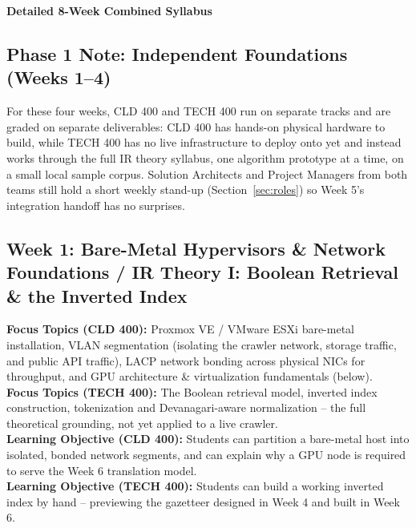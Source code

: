 \documentclass[10pt, a4paper]{article}
\newcommand{\sectionbar}[1]{%
  \par\vspace{0.7em}
  \refstepcounter{section}%
  \noindent\colorbox{secondary}{\parbox{\dimexpr\textwidth-2\fboxsep\relax}{\centering\color{white}\bfseries\Large #1}}%
  \par\vspace{0.5em}
}
\begin{document}
\newpage

\sectionbar{Detailed 8-Week Combined Syllabus}
\label{sec:weekly}

\subsection*{Phase 1 Note: Independent Foundations (Weeks 1--4)}
For these four weeks, CLD 400 and TECH 400 run on separate tracks and are graded on separate deliverables: CLD 400 has hands-on physical hardware to build, while TECH 400 has no live infrastructure to deploy onto yet and instead works through the full IR theory syllabus, one algorithm prototype at a time, on a small local sample corpus. Solution Architects and Project Managers from both teams still hold a short weekly stand-up (Section~\ref{sec:roles}) so Week 5's integration handoff has no surprises.

\subsection*{Week 1: Bare-Metal Hypervisors \& Network Foundations / IR Theory I: Boolean Retrieval \& the Inverted Index}
\textbf{Focus Topics (CLD 400):} Proxmox VE / VMware ESXi bare-metal installation, VLAN segmentation (isolating the crawler network, storage traffic, and public API traffic), LACP network bonding across physical NICs for throughput, and GPU architecture \& virtualization fundamentals (below). \\[0.35em]
\textbf{Focus Topics (TECH 400):} The Boolean retrieval model, inverted index construction, tokenization and Devanagari-aware normalization -- the full theoretical grounding, not yet applied to a live crawler. \\[0.35em]
\textbf{Learning Objective (CLD 400):} Students can partition a bare-metal host into isolated, bonded network segments, and can explain why a GPU node is required to serve the Week 6 translation model. \\[0.35em]
\textbf{Learning Objective (TECH 400):} Students can build a working inverted index by hand -- previewing the gazetteer designed in Week 4 and built in Week 6.
\end{document}
